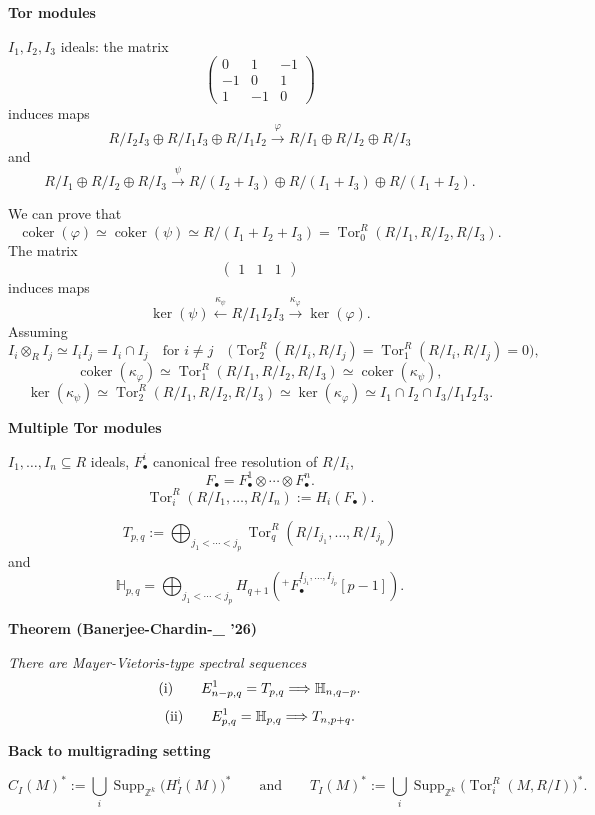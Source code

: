 \medskip\noindent
{\bf Tor modules}

$I_1,I_2,I_3$ ideals: the matrix
$$
\begin{pmatrix}
0&1&-1\\
-1&0&1\\
1&-1&0
\end{pmatrix}
$$
induces maps
$$
R/I_2I_3\oplus R/I_1I_3\oplus R/I_1I_2
\xrightarrow{\varphi}
R/I_1\oplus R/I_2\oplus R/I_3
$$
and
$$
R/I_1\oplus R/I_2\oplus R/I_3
\xrightarrow{\psi}
R/(I_2+I_3)\oplus R/(I_1+I_3)
\oplus R/(I_1+I_2).
$$

We can prove that
$$
\operatorname{coker}(\varphi)
\simeq
\operatorname{coker}(\psi)
\simeq
R/(I_1+I_2+I_3)
=
\operatorname{Tor}_0^R
(R/I_1,R/I_2,R/I_3).
$$
The matrix
$$
\begin{pmatrix}1&1&1\end{pmatrix}
$$
induces maps
$$
\ker(\psi)
\xleftarrow{\kappa_\psi}
R/I_1I_2I_3
\xrightarrow{\kappa_\varphi}
\ker(\varphi).
$$
Assuming
$$
I_i\otimes_R I_j
\simeq
I_iI_j
=
I_i\cap I_j
\quad\text{for }i\neq j
\quad
\bigl(
\operatorname{Tor}_2^R(R/I_i,R/I_j)
=
\operatorname{Tor}_1^R(R/I_i,R/I_j)
=
0
\bigr),
$$
$$
\operatorname{coker}(\kappa_\varphi)
\simeq
\operatorname{Tor}_1^R
(R/I_1,R/I_2,R/I_3)
\simeq
\operatorname{coker}(\kappa_\psi),
$$
$$
\ker(\kappa_\psi)
\simeq
\operatorname{Tor}_2^R
(R/I_1,R/I_2,R/I_3)
\simeq
\ker(\kappa_\varphi)
\simeq
I_1\cap I_2\cap I_3/I_1I_2I_3.
$$

\medskip\noindent
{\bf Multiple Tor modules}

$I_1,\ldots,I_n\subseteq R$ ideals,
$F_\bullet^i$ canonical free resolution
of $R/I_i$,
$$
F_\bullet
=
F_\bullet^1\otimes\cdots\otimes
F_\bullet^n.
$$
$$
\operatorname{Tor}_i^R
(R/I_1,\ldots,R/I_n)
:=
H_i(F_\bullet).
$$

$$
T_{p,q}
:=
\bigoplus_{j_1<\cdots<j_p}
\operatorname{Tor}_q^R
(R/I_{j_1},\ldots,R/I_{j_p})
$$
and
$$
\mathbb{H}_{p,q}
=
\bigoplus_{j_1<\cdots<j_p}
H_{q+1}
\left(
{}^+F_\bullet^{I_{j_1},\ldots,I_{j_p}}
[p-1]
\right).
$$

\medskip\noindent
{\bf Theorem (Banerjee-Chardin-\_ '26)}

{\it There are Mayer-Vietoris-type
spectral sequences}
$$
\textnormal{(i)}
\qquad
E_{n-p,q}^1
=
T_{p,q}
\Longrightarrow
\mathbb{H}_{n,q-p}.
$$
$$
\textnormal{(ii)}
\qquad
E_{p,q}^1
=
\mathbb{H}_{p,q}
\Longrightarrow
T_{n,p+q}.
$$

\medskip\noindent
{\bf Back to multigrading setting}

$$
C_I(M)^*
:=
\bigcup_i
\operatorname{Supp}_{\mathbb{Z}^k}
\bigl(H_I^i(M)\bigr)^*
\qquad\text{and}\qquad
T_I(M)^*
:=
\bigcup_i
\operatorname{Supp}_{\mathbb{Z}^k}
\bigl(\operatorname{Tor}_i^R(M,R/I)\bigr)^*.
$$

